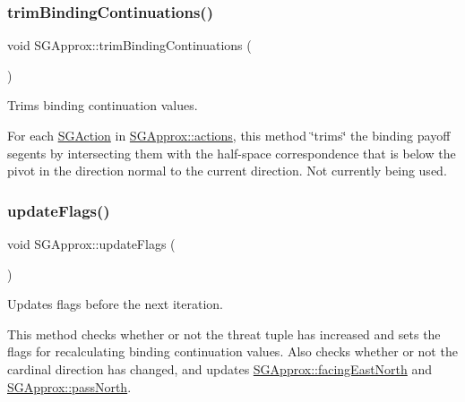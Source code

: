 \subsubsection{\texorpdfstring{trim\+Binding\+Continuations()}{trimBindingContinuations()}}
{\footnotesize\ttfamily void S\+G\+Approx\+::trim\+Binding\+Continuations (\begin{DoxyParamCaption}{ }\end{DoxyParamCaption})\hspace{0.3cm}{\ttfamily [private]}}



Trims binding continuation values. 

For each \hyperlink{classSGAction}{S\+G\+Action} in \hyperlink{classSGApprox_a0fccecf0f5dbe7e9288e47182f180879}{S\+G\+Approx\+::actions}, this method \char`\"{}trims\char`\"{} the binding payoff segents by intersecting them with the half-\/space correspondence that is below the pivot in the direction normal to the current direction. Not currently being used. \mbox{\label{classSGApprox_a93455458a21bdeccff21a6163932c38a}} 
\subsubsection{\texorpdfstring{update\+Flags()}{updateFlags()}}
{\footnotesize\ttfamily void S\+G\+Approx\+::update\+Flags (\begin{DoxyParamCaption}{ }\end{DoxyParamCaption})\hspace{0.3cm}{\ttfamily [private]}}



Updates flags before the next iteration. 

This method checks whether or not the threat tuple has increased and sets the flags for recalculating binding continuation values. Also checks whether or not the cardinal direction has changed, and updates \hyperlink{classSGApprox_a44ce2e0eba77e1c7c155f38662cba9d0}{S\+G\+Approx\+::facing\+East\+North} and \hyperlink{classSGApprox_aec0377b26f0efaea314f72554a8862b9}{S\+G\+Approx\+::pass\+North}. \mbox{\label{classSGApprox_aea5ce8a2f48c7a572477f5f60520d565}} 
